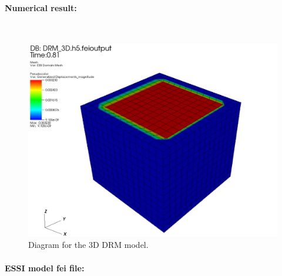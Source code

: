 \paragraph{Numerical result:} ~

\begin{figure}[!htb]
  \centering
  \includegraphics[width=15cm]{./Figure-files/_Chapter_Appendix_Illustrative_Examples/3d_drm_result429.png}
  \caption{Diagram for the 3D DRM model.}
  \label{fig Diagram for the 3D DRM model}
\end{figure}


\paragraph{ESSI model fei file: } ~

